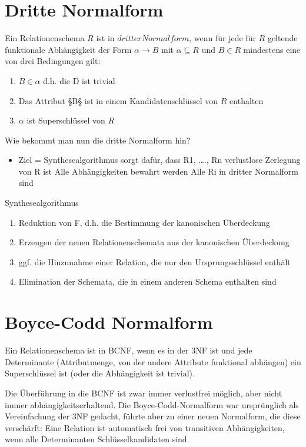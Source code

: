 \section{Dritte Normalform}
Ein Relationenschema $R$ ist in $dritter Normalform$, wenn für jede für $R$ geltende funktionale Abhängigkeit der Form $\alpha \rightarrow B$ mit $\alpha \subseteq R$ und $B \in R$ mindestens eine von drei Bedingungen gilt: 
\begin{enumerate}
\item $B \in \alpha$ d.h. die D ist trivial
\item Das Attribut §B§ ist in einem Kandidatenschlüssel von $R$ enthalten
\item $\alpha$ ist Superschlüssel von $R$
\end{enumerate}
Wie bekommt man nun die dritte Normalform hin?
\begin{itemize}
\item Ziel = Synthesealgorithmus sorgt dafür, dass
\subitem R1, …., Rn verlustlose Zerlegung von R ist
\subitem Alle Abhängigkeiten bewahrt werden
\subitem Alle Ri in dritter Normalform sind
\end{itemize}
Synthesealgorithmus
\begin{enumerate}
\item Reduktion von F, d.h. die Bestimmung der kanonischen Überdeckung
\item Erzeugen der neuen Relationenschemata aus der kanonischen Überdeckung
\item ggf. die Hinzunahme einer Relation, die nur den Ursprungsschlüssel enthält
\item Elimination der Schemata, die in einem anderen Schema enthalten sind
\end{enumerate}
\section{Boyce-Codd Normalform}
Ein Relationenschema ist in BCNF, wenn es in der 3NF ist und jede Determinante (Attributmenge, von der andere Attribute funktional abhängen) ein Superschlüssel ist (oder die Abhängigkeit ist trivial).

Die Überführung in die BCNF ist zwar immer verlustfrei möglich, aber nicht immer abhängigkeitserhaltend. Die Boyce-Codd-Normalform war ursprünglich als Vereinfachung der 3NF gedacht, führte aber zu einer neuen Normalform, die diese verschärft: Eine Relation ist automatisch frei von transitiven Abhängigkeiten, wenn alle Determinanten Schlüsselkandidaten sind.\\

